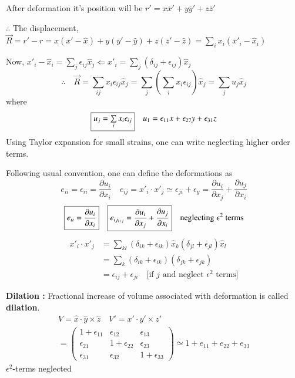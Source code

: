 After deformation it's position will be $r'=x\overline{x}'+y\overline{y}'+z\overline{z}'$

$\therefore$ The displacement, $\overrightarrow{R}=r'-r=x(\overline{x}'-\widehat{x})+y(\overline{y}'-\widehat{y})+z(\overline{z}'-\widehat{z})=\sum\limits_{i}x_{i}(\overline{x}'_{i}-\widehat{x}_{i})$

Now, $x'_{i}-\widehat{x}_{i}=\sum\limits_{j}\epsilon_{ij}\widehat{x}_{j}\Leftarrow x'_{i}=\sum\limits_{j}(\delta_{ij}+\epsilon_{ij})\widehat{x}_{j}$
$$
\therefore\quad \overrightarrow{R}=\sum\limits_{ij}x_{i}\epsilon_{ij}\widehat{x}_{j}=\sum\limits_{j}\left(\sum\limits_{i}x_{i}\epsilon_{ij}\right)\widehat{x}_{j}=\sum\limits_{j}u_{j}\widehat{x}_{j}
$$
where
$$
\fbox{$u_{j}=\sum\limits_{i}x_{i}\epsilon_{ij}$}\quad u_{1}=\epsilon_{11}x+\epsilon_{27}y+\epsilon_{31}z
$$
Using Taylor expansion for small strains, one can write  neglecting higher order terms.

Following usual convention, one can define the deformations as
$$
e_{ii}=\epsilon_{ii}=\dfrac{\partial u_{i}}{\partial x_{i}}\quad e_{ij}=x'_{i}\cdot x'_{j}\simeq \epsilon_{ji}+\epsilon_{y}=\dfrac{\partial u_{i}}{\partial x_{j}}+\dfrac{\partial u_{j}}{\partial x_{i}}
$$
$$
\fbox{$e_{ii}=\dfrac{\partial u_{i}}{\partial x_{i}}$}\quad \fbox{$e_{ij_{i+j}}=\dfrac{\partial u_{i}}{\partial x_{j}}+\dfrac{\partial u_{j}}{\partial x_{i}}$}\quad \text{neglecting $\epsilon^{2}$ terms}
$$
\begin{align*}
x'_{i}\cdot x'_{j} &= \sum\limits_{kl}(\delta_{ik}+\epsilon_{ik})\widehat{x}_{k}(\delta_{jl}+\epsilon_{jl})\widehat{x}_{l}\\
&= \sum\limits_{k}(\delta_{ik}+\epsilon_{ik})(\delta_{jk}+\epsilon_{jk})\\
&= \epsilon_{ij}+\epsilon_{ji}\quad\text{[if $j$ and neglect $\epsilon^{2}$ terms]}
\end{align*}

\noindent
{\bf Dilation :} Fractional increase of volume associated with deformation is called {\bf dilation}.
\begin{gather*}
V=\widehat{x}\cdot \widehat{y}\times \widehat{z}\quad V'=x'\cdot y'\times z'\\
= \left(
\begin{array}{ccc}
1+\epsilon_{11} & \epsilon_{12} & \epsilon_{13}\\
\epsilon_{21} & 1+\epsilon_{22} & \epsilon_{23}\\
\epsilon_{31} & \epsilon_{32} & 1+\epsilon_{33}
\end{array}
\right)\simeq 1+e_{11}+e_{22}+e_{33}
\end{gather*}
$\epsilon^{2}$-terms neglected

